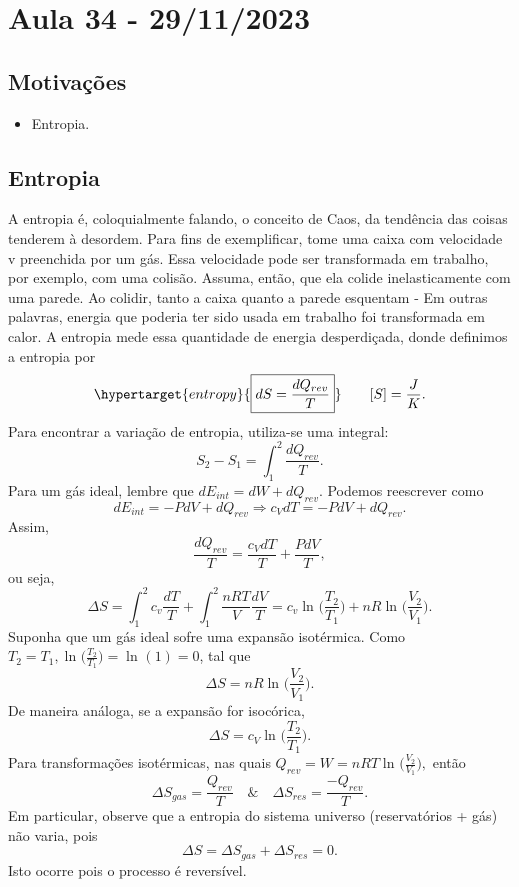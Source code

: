 \documentclass[phsyicsII_notes.tex]{subfiles}
\begin{document}
\section{Aula 34 - 29/11/2023}
\subsection{Motivações}
\begin{itemize}
	\item Entropia.
\end{itemize}
\subsection{Entropia}
A entropia é, coloquialmente falando, o conceito de Caos, da tendência das coisas tenderem à desordem.
Para fins de exemplificar, tome uma caixa com velocidade v preenchida por um gás. Essa velocidade pode ser transformada
em trabalho, por exemplo, com uma colisão. Assuma, então, que ela colide inelasticamente com uma parede. Ao colidir, tanto a
caixa quanto a parede esquentam - Em outras palavras, energia que poderia ter sido usada em trabalho foi transformada em calor.
A entropia mede essa quantidade de energia desperdiçada, donde definimos a entropia por
\[
	\hypertarget{entropy}{\boxed{dS = \frac{dQ_{rev}}{T}}}\quad\quad [S] = \frac{J}{K}.
\]
Para encontrar a variação de entropia, utiliza-se uma integral:
\[
	S_{2}-S_{1} = \int_{1}^{2}\frac{dQ_{rev}}{T}.
\]
Para um gás ideal, lembre que \(dE_{int} = dW + dQ_{rev}\). Podemos reescrever como
\[
	dE_{int} = -PdV + dQ_{rev}\Rightarrow c_{V}dT = -PdV + dQ_{rev}.
\]
Assim,
\[
	\frac{dQ_{rev}}{T} = \frac{c_{V}dT}{T}+\frac{PdV}{T},
\]
ou seja,
\[
	\Delta S = \int_{1}^{2} c_{v}\frac{dT}{T} + \int_{1}^{2} \frac{nRT}{V}\frac{dV}{T} = c_{v}\ln^{}{\biggl(\frac{T_{2}}{T_{1}}\biggr)} + nR\ln^{}{\biggl(\frac{V_{2}}{V_{1}}\biggr)}.
\]
Suponha que um gás ideal sofre uma expansão isotérmica. Como \(T_{2} = T_{1}, \ln^{}{\biggl(\frac{T_{2}}{T_{1}}\biggr)} = \ln^{}{(1)}=0\),
tal que
\[
	\Delta S = nR\ln^{}{\biggl(\frac{V_{2}}{V_{1}}\biggr)}.
\]
De maneira análoga, se a expansão for isocórica,
\[
	\Delta S = c_{V}\ln^{}{\biggl(\frac{T_{2}}{T_{1}}\biggr)}.
\]
Para transformações isotérmicas, nas quais \(Q_{rev} = W = nRT\ln^{}{\biggl(\frac{V_{2}}{V_{1}}\biggr)},\) então
\[
	\Delta S_{gas} = \frac{Q_{rev}}{T}\quad\&\quad \Delta S_{res} = \frac{-Q_{rev}}{T}.
\]
Em particular, observe que a entropia do sistema universo (reservatórios + gás) não varia, pois
\[
	\Delta S = \Delta S_{gas} + \Delta S_{res} = 0.
\]
Isto ocorre pois o processo é reversível.
\end{document}
